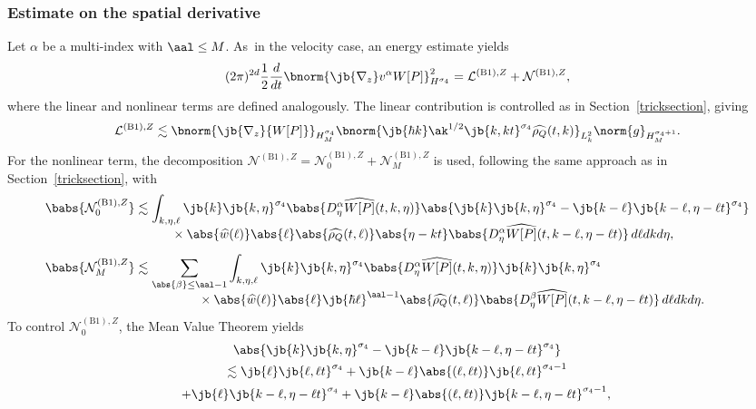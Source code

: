\subsubsection{Estimate on the spatial derivative}
Let $\alpha$ be a multi-index with $\aal\leq M$. As~in the velocity case, an energy estimate yields
\begin{align*}
(2\pi)^{2d}\frac{1}{2}\frac{d}{dt}\bnorm{\jb{\nabla_z}v^\alpha{W[P]}}_{H^{\sigma_4}}^2=\mathcal{L}^{\mathrm{(B1)},Z} + \mathcal{N}^{\mathrm{(B1)},Z},
\end{align*}where the linear and nonlinear terms are defined analogously. The linear contribution is controlled as in Section~\ref{tricksection}, giving
\begin{align*}
\mathcal{L}^{\mathrm{(B1)},Z}\lesssim\bnorm{\jb{\nabla_z}{W[P]}}_{H^{\sigma_4}_M}\bnorm{\jb{\hbar k}\ak^{1/2}\jb{k,kt}^{\sigma_4}\widehat{\rho_Q}(t,k)}_{L^2_{k}}\norm{g}_{H^{\sigma_4+1}_M}.
\end{align*}
For the nonlinear term, the decomposition $\mathcal N^{\mathrm{(B1)},Z}=\mathcal{N}_0^{\mathrm{(B1)},Z}+\mathcal{N}_M^{\mathrm{(B1)},Z}$ is used, following the same approach as in Section~\ref{tricksection}, with
\begin{align*}
\babs{\mathcal{N}_0^{\mathrm{(B1)},Z}}&\lesssim\int_{k,\eta,\ell }\jb{k}\jb{k,\eta}^{\sigma_4}\babs{D_\eta^\alpha \widehat{W[P]}(t,k,\eta)}\abs{\jb{k}\jb{k,\eta}^{\sigma_4}-\jb{k-\ell }\jb{k-\ell ,\eta-\ell t}^{\sigma_4}}\\[-5pt]
&\hspace{1cm}\times\abs{\widehat{w}(\ell )}\abs{\ell }\abs{\widehat{\rho_Q}(t,\ell )}\abs{\eta-kt}\babs{D_\eta^\alpha\widehat{W[P]}(t,k-\ell ,\eta-\ell t)}\,d\ell dkd\eta,\\[5pt]
\babs{\mathcal{N}_M^{\mathrm{(B1)},Z}}&\lesssim\sum_{\abs{\beta}\leq \aal-1}\int_{k,\eta,\ell }\jb{k}\jb{k,\eta}^{\sigma_4}\babs{D_\eta^\alpha \widehat{W[P]}(t,k,\eta)}\jb{k}\jb{k,\eta}^{\sigma_4}\\[-5pt]
&\hspace{1.75cm}\times\abs{\widehat{w}(\ell )}\abs{\ell }\jb{\hbar\ell}^{\aal-1}\abs{\widehat{\rho_Q}(t,\ell )}\babs{D_\eta^\beta\widehat{W[P]}(t,k-\ell ,\eta-\ell t)}\,d\ell dkd\eta.
\end{align*}
To control $\mathcal{N}_0^{\mathrm{(B1)},Z}$, the Mean Value Theorem yields
\begin{multline*}
\abs{\jb{k}\jb{k,\eta}^{\sigma_4}-\jb{k-\ell }\jb{k-\ell ,\eta-\ell t}^{\sigma_4}}\vphantom{2_{A_A}}\\
\lesssim\jb{\ell }\jb{\ell ,\ell t}^{\sigma_4}+\jb{k-\ell }\abs{(\ell ,\ell t)}\jb{\ell ,\ell t}^{\sigma_4-1}\\
+\jb{\ell }\jb{k-\ell ,\eta-\ell t}^{\sigma_4}+\jb{k-\ell }\abs{(\ell ,\ell t)}\jb{k-\ell ,\eta-\ell t}^{\sigma_4-1},\vphantom{2^{B^B}}
\end{multline*}
